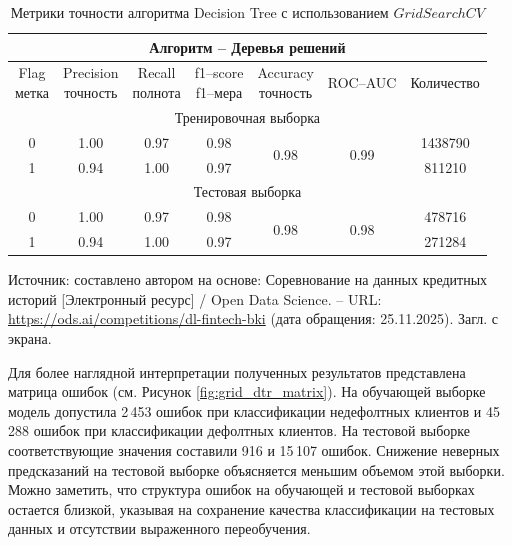 \newpage
\begin{center}
	\begin{longtable}{|c|c|c|c|c|c|c|}
		\caption{Метрики точности алгоритма Decision Tree с использованием $GridSearchCV$}
		\label{new_dtc_gs} \\
		\hline
		\multicolumn{7}{|c|}{Алгоритм -- Деревья решений}\\
		\hline
		\rowcolor[gray]{.9}
		\specialcell{Flag\\метка} &
		\specialcell{Precision\\точность} &
		\specialcell{Recall\\полнота} &
		\specialcell{f1--score\\f1--мера} &
		\specialcell{Accuracy\\точность}  &
		ROC--AUC &
		Количество    \\
		\hline
		\multicolumn{7}{|c|}{Тренировочная выборка}\\
		\hline
		0 & 1.00 & 0.97 & 0.98 &
		\multirow{2}{*}{0.98} &   
		\multirow{2}{*}{0.99} &  
		1438790\\                    
		\cline{1-4} \cline{7-7}
		1 & 0.94 & 1.00 & 0.97 &  
		&      & 811210 \\       
		\hline
		\multicolumn{7}{|c|}{Тестовая выборка} \\
		\hline
		0 & 1.00 & 0.97 & 0.98 &
		\multirow{2}{*}{0.98} &
		\multirow{2}{*}{0.98} &
		478716 \\
		\cline{1-4} \cline{7-7}
		1 & 0.94 & 1.00 & 0.97 & & & 271284 \\
		\hline
	\end{longtable}
	\begin{minipage}{\textwidth}
		\fontsize{9}{11}\selectfont
		\justifying
		Источник: составлено автором на основе: Соревнование на данных кредитных историй [Электронный ресурс] / Open Data Science. -- URL: \url{https://ods.ai/competitions/dl-fintech-bki} (дата обращения: 25.11.2025). Загл. с экрана.
	\end{minipage}
\end{center}

Для более наглядной интерпретации полученных результатов представлена матрица ошибок (см. Рисунок \ref{fig:grid_dtr_matrix}). %
На обучающей выборке модель допустила 2\,453 ошибок при классификации недефолтных клиентов и 45\,288 ошибок при классификации дефолтных клиентов. На тестовой выборке соответствующие значения составили 916 и 15\,107 ошибок. Снижение неверных предсказаний на тестовой выборке объясняется меньшим объемом этой выборки. Можно заметить, что структура ошибок на обучающей и тестовой выборках остается близкой, указывая на сохранение качества классификации на тестовых данных и отсутствии выраженного переобучения.

